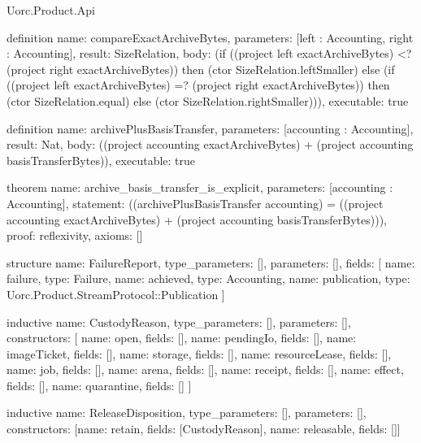 \begin{lexlean}{Uorc.Product.Api}
\begin{semanticmodule}
definition{
  name: compareExactArchiveBytes,
  parameters: [left : Accounting, right : Accounting],
  result: SizeRelation,
  body: (if ((project left exactArchiveBytes) <? (project right exactArchiveBytes)) then (ctor SizeRelation.leftSmaller) else (if ((project left exactArchiveBytes) =? (project right exactArchiveBytes)) then (ctor SizeRelation.equal) else (ctor SizeRelation.rightSmaller))),
  executable: true
}

definition{
  name: archivePlusBasisTransfer,
  parameters: [accounting : Accounting],
  result: Nat,
  body: ((project accounting exactArchiveBytes) + (project accounting basisTransferBytes)),
  executable: true
}

theorem{
  name: archive_basis_transfer_is_explicit,
  parameters: [accounting : Accounting],
  statement: ((archivePlusBasisTransfer accounting) = ((project accounting exactArchiveBytes) + (project accounting basisTransferBytes))),
  proof: reflexivity{},
  axioms: []
}

structure{
  name: FailureReport,
  type_parameters: [],
  parameters: [],
  fields: [
    {name: failure, type: Failure},
    {name: achieved, type: Accounting},
    {name: publication, type: Uorc.Product.StreamProtocol::Publication}
  ]
}

inductive{
  name: CustodyReason,
  type_parameters: [],
  parameters: [],
  constructors: [
    {name: open, fields: []},
    {name: pendingIo, fields: []},
    {name: imageTicket, fields: []},
    {name: storage, fields: []},
    {name: resourceLease, fields: []},
    {name: job, fields: []},
    {name: arena, fields: []},
    {name: receipt, fields: []},
    {name: effect, fields: []},
    {name: quarantine, fields: []}
  ]
}

inductive{
  name: ReleaseDisposition,
  type_parameters: [],
  parameters: [],
  constructors: [{name: retain, fields: [CustodyReason]}, {name: releasable, fields: []}]
}
\end{semanticmodule}
\end{lexlean}
